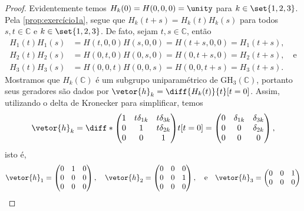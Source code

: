 \begin{proof}
    Evidentemente temos \(H_k(0) = H(0,0,0) = \unity\) para \(k \in \set{1,2,3}\). Pela \cref{prop:exercício1a}, segue que \(H_k(t+s) = H_k(t)H_k(s)\) para todos \(s, t \in \mathbb{C}\) e \(k \in \set{1,2,3}\). De fato, sejam \(t, s \in \mathbb{C}\), então
    \begin{align*}
        H_1(t)H_1(s) &= H(t,0,0)H(s,0,0) = H(t + s,0,0) = H_1(t+s),\\
        H_2(t)H_2(s) &= H(0,t,0)H(0,s,0) = H(0,t + s,0) = H_2(t+s),\quad\text{e}\\
        H_3(t)H_3(s) &= H(0,0,t)H(0,0,s) = H(0,0,t + s) = H_3(t+s).
    \end{align*}
    Mostramos que \(H_k(\mathbb{C})\) é um subgrupo uniparamétrico de \(\mathrm{GH}_3(\mathbb{C})\), portanto seus geradores são dados por \(\vetor{h}_k = \diff{H_k(t)}{t}[t=0]\). Assim, utilizando o delta de Kronecker para simplificar, temos
    \begin{equation*}
        \vetor{h}_k = \diff*{\begin{pmatrix}
                1 & t \delta_{1k} & t \delta_{3k}\\
                0 & 1 & t \delta_{2k}\\
                0 & 0 & 1
        \end{pmatrix}}{t}[t=0] = \begin{pmatrix}
                0 & \delta_{1k} & \delta_{3k}\\
                0 & 0 & \delta_{2k}\\
                0 & 0 & 0
        \end{pmatrix},
    \end{equation*}
    isto é,
    \begin{equation*}
        \vetor{h}_1 = \begin{pmatrix}
            0 & 1 & 0\\
            0 & 0 & 0\\
            0 & 0 & 0
        \end{pmatrix},\quad
        \vetor{h}_2 = \begin{pmatrix}
            0 & 0 & 0\\
            0 & 0 & 1\\
            0 & 0 & 0
        \end{pmatrix},\quad\text{e}\quad
        \vetor{h}_3 = \begin{pmatrix}
            0 & 0 & 1\\
            0 & 0 & 0\\

\end{pmatrix}
\end{equation*}
\end{proof}
